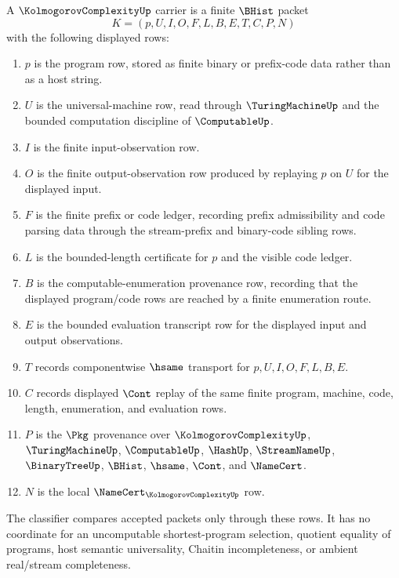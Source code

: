 \begin{definition}
\label{def:kolmogorov-complexity-carrier}
A $\KolmogorovComplexityUp$ carrier is a finite $\BHist$ packet
$$
K=(p,U,I,O,F,L,B,E,T,C,P,N)
$$
with the following displayed rows:
\begin{enumerate}
\item $p$ is the program row, stored as finite binary or prefix-code data rather than as a host string.
\item $U$ is the universal-machine row, read through $\TuringMachineUp$ and the bounded computation discipline of $\ComputableUp$.
\item $I$ is the finite input-observation row.
\item $O$ is the finite output-observation row produced by replaying $p$ on $U$ for the displayed input.
\item $F$ is the finite prefix or code ledger, recording prefix admissibility and code parsing data through the stream-prefix and binary-code sibling rows.
\item $L$ is the bounded-length certificate for $p$ and the visible code ledger.
\item $B$ is the computable-enumeration provenance row, recording that the displayed program/code rows are reached by a finite enumeration route.
\item $E$ is the bounded evaluation transcript row for the displayed input and output observations.
\item $T$ records componentwise $\hsame$ transport for $p,U,I,O,F,L,B,E$.
\item $C$ records displayed $\Cont$ replay of the same finite program, machine, code, length, enumeration, and evaluation rows.
\item $P$ is the $\Pkg$ provenance over $\KolmogorovComplexityUp$, $\TuringMachineUp$, $\ComputableUp$, $\HashUp$, $\StreamNameUp$, $\BinaryTreeUp$, $\BHist$, $\hsame$, $\Cont$, and $\NameCert$.
\item $N$ is the local $\NameCert_{\KolmogorovComplexityUp}$ row.
\end{enumerate}
The classifier compares accepted packets only through these rows. It has no coordinate for an uncomputable shortest-program selection, quotient equality of programs, host semantic universality, Chaitin incompleteness, or ambient real/stream completeness.
\end{definition}


